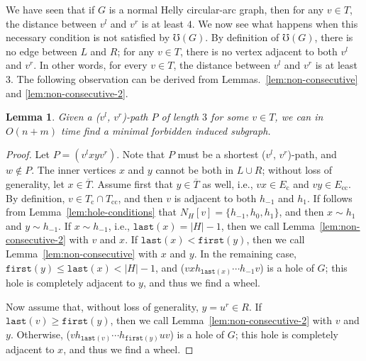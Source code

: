 \documentclass[10pt]{article}
\newtheorem{lemma}[theorem]{Lemma}
\newcommand{\badgraph}{minimal forbidden induced subgraph}
\newcommand{\nhcag}{normal Helly circular-arc graph}
\newcommand{\head}[1]{\ensuremath{{\mathtt{last}(#1)}}}
\newcommand{\tail}[1]{\ensuremath{{\mathtt{first}(#1)}}}
\newcommand{\stpath}[2]{($#1$, $#2$)-path}
\newcommand{\ec}{\ensuremath{E_{\text{c}}}}
\newcommand{\ecc}{\ensuremath{E_{\text{cc}}}}
\newcommand{\oc}{\ensuremath{T_{\text{c}}}}
\newcommand{\oo}{\ensuremath{T}}
\newcommand{\occ}{\ensuremath{T_{\text{cc}}}}
\begin{document}
We have seen that if $G$ is a \nhcag, then for any $v\in \oo$, the
distance between $v^l$ and $v^r$ is at least $4$.  We now see what
happens when this necessary condition is not satisfied by $\mho(G)$.
By definition of $\mho(G)$, there is no edge between $L$ and $R$; for
any $v\in \oo$, there is no vertex adjacent to both $v^l$ and $v^r$.
In other words, for every $v\in \oo$, the distance between $v^l$ and
$v^r$ is at least $3$.  The following observation can be derived from
Lemmas.~\ref{lem:non-consecutive} and \ref{lem:non-consecutive-2}.
\begin{lemma}\label{lem:3-cover}
  Given a \stpath{v^l}{v^r} $P$ of length $3$ for some $v\in \oo$, we
  can in $O(n + m)$ time find a \badgraph.
\end{lemma}
\begin{proof}
  Let $P = (v^l x y v^r)$.  Note that $P$ must be a shortest
  \stpath{v^l}{v^r}, and $w\not\in P$.  The inner vertices $x$ and $y$
  cannot be both in $L\cup R$; without loss of generality, let $x\in
  \overline{\oo}$.  Assume first that $y\in \overline{\oo}$ as well,
  i.e., $v x\in \ec$ and $v y\in \ecc$.  By definition, $v\in
  \oc\cap\occ$, and then $v$ is adjacent to both $h_{-1}$ and $h_1$.
  If follows from Lemma~\ref{lem:hole-conditions} that $N_H[v] =
  \{h_{-1}, h_0, h_1\}$, and then $x\sim h_1$ and $y\sim h_{-1}$.  If
  $x\sim h_{-1}$, i.e., $\head{x} = |H| - 1$, then we call
  Lemma~\ref{lem:non-consecutive-2} with $v$ and $x$.  If $\head{x} <
  \tail{y}$, then we call Lemma~\ref{lem:non-consecutive} with $x$ and
  $y$.  In the remaining case, $\tail{y}\le \head{x}< |H| - 1$, and
  ($v x h_{\head{x}} \cdots h_{-1} v$) is a hole of $G$; this hole is
  completely adjacent to $y$, and thus we find a wheel.

  Now assume that, without loss of generality, $y = u^r \in R$.  If
  $\head{v} \ge \tail{y}$, then we call
  Lemma~\ref{lem:non-consecutive-2} with $v$ and $y$.  Otherwise, ($v
  h_{\head{v}} \cdots h_{\tail{y}} u v$) is a hole of $G$; this hole
  is completely adjacent to $x$, and thus we find a wheel.
\end{proof}
\end{document}
